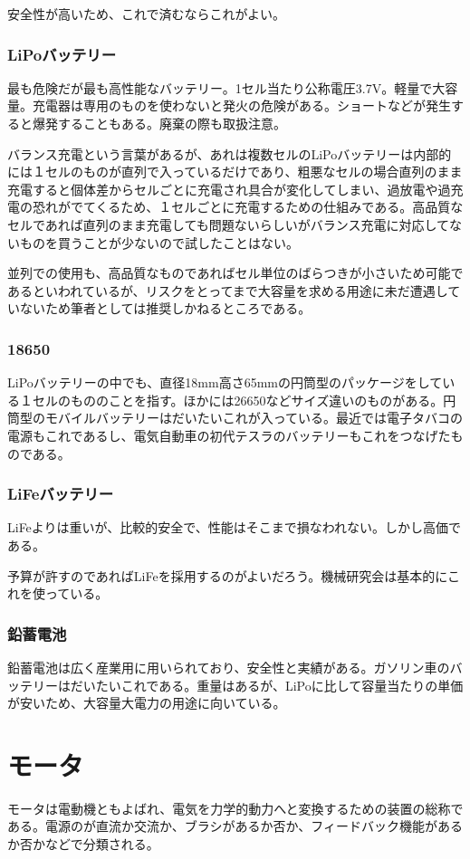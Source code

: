 \documentclass[a4paper,titlepage,here]{ujarticle}
\begin{document}
安全性が高いため、これで済むならこれがよい。
\subsubsection{LiPoバッテリー}
最も危険だが最も高性能なバッテリー。1セル当たり公称電圧3.7V。軽量で大容量。充電器は専用のものを使わないと発火の危険がある。ショートなどが発生すると爆発することもある。廃棄の際も取扱注意。

バランス充電という言葉があるが、あれは複数セルのLiPoバッテリーは内部的には１セルのものが直列で入っているだけであり、粗悪なセルの場合直列のまま充電すると個体差からセルごとに充電され具合が変化してしまい、過放電や過充電の恐れがでてくるため、１セルごとに充電するための仕組みである。高品質なセルであれば直列のまま充電しても問題ないらしいがバランス充電に対応してないものを買うことが少ないので試したことはない。

並列での使用も、高品質なものであればセル単位のばらつきが小さいため可能であるといわれているが、リスクをとってまで大容量を求める用途に未だ遭遇していないため筆者としては推奨しかねるところである。
\subsubsection{18650}
LiPoバッテリーの中でも、直径18mm高さ65mmの円筒型のパッケージをしている１セルのもののことを指す。ほかには26650などサイズ違いのものがある。円筒型のモバイルバッテリーはだいたいこれが入っている。最近では電子タバコの電源もこれであるし、電気自動車の初代テスラのバッテリーもこれをつなげたものである。
\subsubsection{LiFeバッテリー}
LiFeよりは重いが、比較的安全で、性能はそこまで損なわれない。しかし高価である。

予算が許すのであればLiFeを採用するのがよいだろう。機械研究会は基本的にこれを使っている。
\subsubsection{鉛蓄電池}
鉛蓄電池は広く産業用に用いられており、安全性と実績がある。ガソリン車のバッテリーはだいたいこれである。重量はあるが、LiPoに比して容量当たりの単価が安いため、大容量大電力の用途に向いている。
\section{モータ}
モータは電動機ともよばれ、電気を力学的動力へと変換するための装置の総称である。電源のが直流か交流か、ブラシがあるか否か、フィードバック機能があるか否かなどで分類される。
\end{document}
